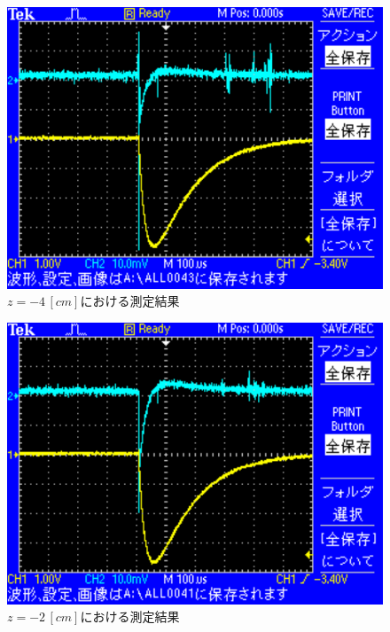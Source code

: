 \begin{figure}[H]
    \centering
    \includegraphics[scale=0.5]{images-20.pdf}
    \caption{$z=-4\,[cm]$における測定結果}
\end{figure}

\begin{figure}[H]
    \centering
    \includegraphics[scale=0.5]{images-19.pdf}
    \caption{$z=-2\,[cm]$における測定結果}
\end{figure}

